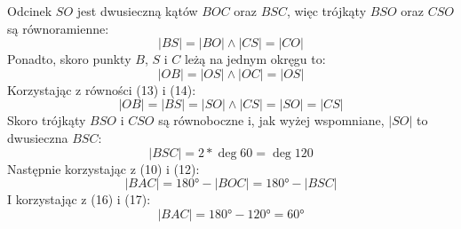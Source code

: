 \documentclass[12pt]{article}
\begin{document}
\begin{justify}
Odcinek $SO$ jest dwusieczną kątów $BOC$ oraz $BSC$, więc trójkąty $BSO$ oraz $CSO$ są równoramienne:
\begin{equation}|BS| = |BO| \land |CS| = |CO|\end{equation}
Ponadto, skoro punkty $B$, $S$ i $C$ leżą na jednym okręgu to:
\begin{equation}|OB| = |OS| \land |OC| = |OS|\end{equation}
Korzystając z równości (13) i (14):
\begin{equation}|OB| = |BS| = |SO| \land |CS| = |SO| = |CS|\end{equation}
Skoro trójkąty $BSO$ i $CSO$ są równoboczne i, jak wyżej wspomniane, $|SO|$ to dwusieczna $BSC$:
\begin{equation}|BSC| = 2 * \deg{60} = \deg{120}\end{equation}
Następnie korzystając z (10) i (12):
\begin{equation}|BAC| = \ang{180} - |BOC| = \ang{180} - |BSC|\end{equation}
I korzystając z (16) i (17):
\begin{equation}|BAC| = \ang{180} - \ang{120} = \ang{60}\end{equation}

\end{justify}
\end{document}
